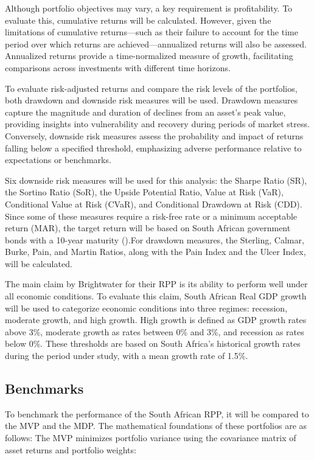 \documentclass[11pt,preprint]{elsarticle}
\numberwithin{equation}{section}
\numberwithin{figure}{section}
\numberwithin{table}{section}
\begin{document}
Although portfolio objectives may vary, a key requirement is
profitability. To evaluate this, cumulative returns will be calculated.
However, given the limitations of cumulative returns---such as their
failure to account for the time period over which returns are
achieved---annualized returns will also be assessed. Annualized returns
provide a time-normalized measure of growth, facilitating comparisons
across investments with different time horizons.

To evaluate risk-adjusted returns and compare the risk levels of the
portfolios, both drawdown and downside risk measures will be used.
Drawdown measures capture the magnitude and duration of declines from an
asset's peak value, providing insights into vulnerability and recovery
during periods of market stress. Conversely, downside risk measures
assess the probability and impact of returns falling below a specified
threshold, emphasizing adverse performance relative to expectations or
benchmarks.

Six downside risk measures will be used for this analysis: the Sharpe
Ratio (SR), the Sortino Ratio (SoR), the Upside Potential Ratio, Value
at Risk (VaR), Conditional Value at Risk (CVaR), and Conditional
Drawdown at Risk (CDD). Since some of these measures require a risk-free
rate or a minimum acceptable return (MAR), the target return will be
based on South African government bonds with a 10-year maturity
().For drawdown
measures, the Sterling, Calmar, Burke, Pain, and Martin Ratios, along
with the Pain Index and the Ulcer Index, will be calculated.

The main claim by Brightwater for their RPP is its ability to perform
well under all economic conditions. To evaluate this claim, South
African Real GDP growth will be used to categorize economic conditions
into three regimes: recession, moderate growth, and high growth. High
growth is defined as GDP growth rates above 3\%, moderate growth as
rates between 0\% and 3\%, and recession as rates below 0\%. These
thresholds are based on South Africa's historical growth rates during
the period under study, with a mean growth rate of 1.5\%.

\subsection{Benchmarks}\label{benchmarks}

To benchmark the performance of the South African RPP, it will be
compared to the MVP and the MDP. The mathematical foundations of these
portfolios are as follows: The MVP minimizes portfolio variance using
the covariance matrix of asset returns and portfolio weights:
\end{document}
